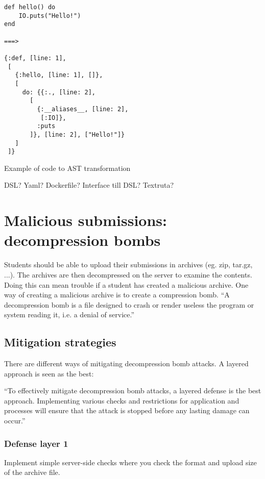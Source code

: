 \label{ast_listing}
\begin{listing}
\begin{verbatim}
def hello() do
    IO.puts("Hello!")
end

===>

{:def, [line: 1],
 [
   {:hello, [line: 1], []},
   [
     do: {{:., [line: 2],
       [
         {:__aliases__, [line: 2],
          [:IO]},
         :puts
       ]}, [line: 2], ["Hello!"]}
   ]
 ]}
\end{verbatim}
\caption{Example of code to AST transformation}
\label{ast_listing}
\end{listing}

DSL? Yaml? Dockerfile?
Interface till DSL? Textruta?



\section{Malicious submissions: decompression bombs}
\label{decompression_bombs}

Students should be able to upload their submissions in archives (eg. zip, tar.gz, ...). The archives are then decompressed on the server to examine the contents. Doing this can mean trouble if a student has created a malicious archive. One way of creating a malicious archive is to create a compression bomb. ``A decompression bomb is a file designed to crash or render useless the program or system reading it, i.e. a denial of service.''~\cite{Bomb.codes}

\subsection*{Mitigation strategies}

There are different ways of mitigating decompression bomb attacks. A layered approach is seen as the best:

``To effectively mitigate decompression bomb attacks, a layered defense is the best approach. Implementing various checks and restrictions for application and processes will ensure that the attack is stopped before any lasting damage can occur.''~\cite{Bomb.codes}

\subsubsection*{Defense layer 1}

Implement simple server-side checks where you check the format and upload size of the archive file.

